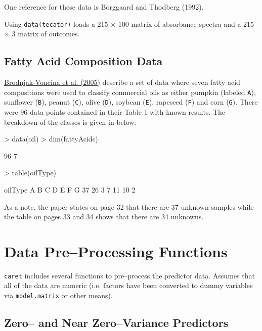 \documentclass[12pt]{article}
\begin{document}
One reference for these data is Borggaard and Thodberg (1992).

Using \texttt{data(tecator)} loads a 215 $\times$ 100 matrix of absorbance spectra and a 215 $\times$ 3 matrix of outcomes.


\subsection{Fatty Acid Composition Data}

\href{http://dx.doi.org/10.1016/j.chemolab.2004.04.011}{Brodnjak-Voncina et al. (2005)} describe a set of data where seven fatty acid compositions were used to classify commercial oils as either pumpkin (labeled \texttt{A}), sunflower (\texttt{B}), peanut (\texttt{C}), olive (\texttt{D}), soybean (\texttt{E}), rapeseed (\texttt{F}) and corn (\texttt{G}). There were 96 data points contained in their Table 1 with known results. The breakdown of the classes is given in below:

\begin{small}
\begin{Schunk}
\begin{Sinput}
> data(oil)
> dim(fattyAcids)
\end{Sinput}
\begin{Soutput}
[1] 96  7
\end{Soutput}
\begin{Sinput}
> table(oilType)
\end{Sinput}
\begin{Soutput}
oilType
 A  B  C  D  E  F  G 
37 26  3  7 11 10  2 
\end{Soutput}
\end{Schunk}
\end{small}

As a note, the paper states on page 32 that there are 37 unknown samples while the table on pages 33 and 34 shows that there are 34 unknowns. 



\section{Data Pre--Processing Functions}

\texttt{caret} includes several functions to pre--process the predictor data.  Assumes that all of the data are numeric (i.e. factors have been converted to dummy variables via \texttt{model.matrix} or other means).

\subsection{Zero-- and Near Zero--Variance Predictors}
\end{document}
